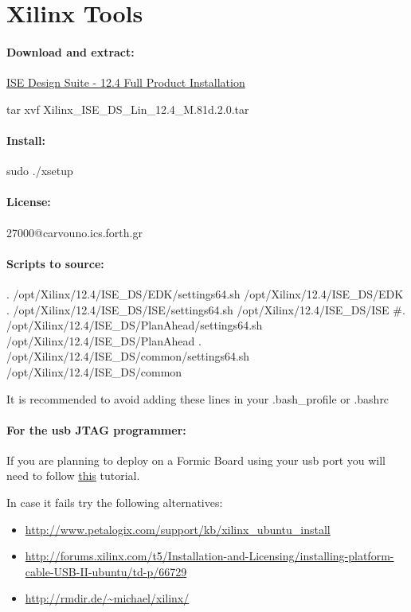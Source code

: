 \documentclass[
a4paper,
12pt,
]{report}
\begin{document}
\section{Xilinx Tools}
\label{sec:xilinx-tools}

\paragraph{Download and extract:}
\href{http://www.xilinx.com/support/download/index.html/content/xilinx/en/downloadNav/design-tools/v12_4.html)}
{ISE  Design Suite - 12.4 Full Product Installation}

\begin{bash}
tar xvf Xilinx_ISE_DS_Lin_12.4_M.81d.2.0.tar
\end{bash}

\paragraph{Install:}
\begin{bash}
sudo ./xsetup
\end{bash}

\paragraph{License:} 27000@carvouno.ics.forth.gr

\paragraph{Scripts to source:}
\begin{bash}
. /opt/Xilinx/12.4/ISE_DS/EDK/settings64.sh /opt/Xilinx/12.4/ISE_DS/EDK
. /opt/Xilinx/12.4/ISE_DS/ISE/settings64.sh /opt/Xilinx/12.4/ISE_DS/ISE
#. /opt/Xilinx/12.4/ISE_DS/PlanAhead/settings64.sh /opt/Xilinx/12.4/ISE_DS/PlanAhead
. /opt/Xilinx/12.4/ISE_DS/common/settings64.sh /opt/Xilinx/12.4/ISE_DS/common
\end{bash}

It is recommended to avoid adding these lines in your .bash\_profile or
.bashrc

\paragraph{For the usb JTAG programmer:}
If you are planning to deploy on a Formic Board using your usb port
you will need to follow
\href{http://www.george-smart.co.uk/wiki/Xilinx_JTAG_Linux}{this}
tutorial.


In case it fails try the following alternatives:
\begin{itemize}
\item \url{http://www.petalogix.com/support/kb/xilinx_ubuntu_install}
\item \url{http://forums.xilinx.com/t5/Installation-and-Licensing/installing-platform-cable-USB-II-ubuntu/td-p/66729}
\item \url{http://rmdir.de/~michael/xilinx/}
\end{itemize}
\end{document}
